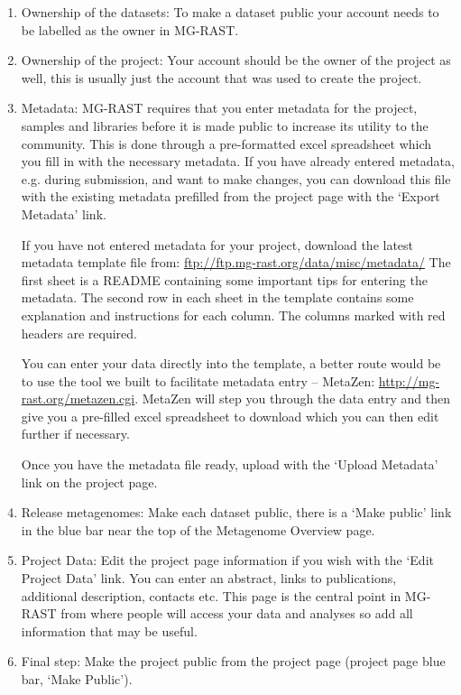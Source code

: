 \documentclass[12pt,fullpage]{report}
\begin{document}
\begin{enumerate}
\item
Ownership of the datasets: To make a dataset public your account needs to be labelled as the owner in MG-RAST.
\item
Ownership of the project: Your account should be the owner of the project as well, this is usually just the account that was used to create the project.
\item
Metadata: MG-RAST requires that you enter metadata for the project, samples and libraries before it is made public to increase its utility to the community. This is done through a pre-formatted excel spreadsheet which you fill in with the necessary metadata.
If you have already entered metadata, e.g. during submission, and want to make changes, you can download this file with the existing metadata prefilled from the project page with the `Export Metadata' link.

If you have not entered metadata for your project, download the latest metadata template file from:
\url{ftp://ftp.mg-rast.org/data/misc/metadata/}
The first sheet is a README containing some important tips for entering the metadata. The second row in each sheet in the template contains some explanation and instructions for each column. The columns marked with red headers are required.

You can enter your data directly into the template, a better route would be to use the tool we built to facilitate metadata entry -- MetaZen: \url{http://mg-rast.org/metazen.cgi}.
MetaZen will step you through the data entry and then give you a pre-filled excel spreadsheet to download which you can then edit further if necessary.

Once you have the metadata file ready, upload with the `Upload Metadata' link on the project page.
\item
Release metagenomes: Make each dataset public, there is a `Make public' link in the blue bar near the top of the Metagenome Overview page.
\item
Project Data: Edit the project page information if you wish with the `Edit Project Data' link. You can enter an abstract, links to publications, additional description, contacts etc. This page is the central point in MG-RAST from where people will access your data and analyses so add all information that may be useful.
\item
Final step: Make the project public from the project page (project page blue bar, `Make Public').
\end{enumerate}
\end{document}

